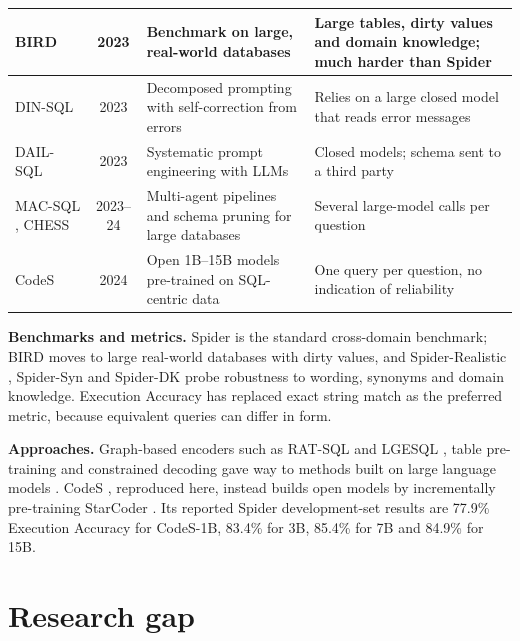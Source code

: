 \begin{table}[!t]
{\begin{tabular}{|p{3.6cm}|c|p{6.0cm}|p{5.2cm}|}
		BIRD \cite{li2023can} & 2023 & Benchmark on large, real-world databases & Large tables, dirty values and domain knowledge; much harder than Spider \\ \hline
		DIN-SQL \cite{pourreza2023dinsql} & 2023 & Decomposed prompting with self-correction from errors & Relies on a large closed model that reads error messages \\ \hline
		DAIL-SQL \cite{gao2023texttosql} & 2023 & Systematic prompt engineering with LLMs & Closed models; schema sent to a third party \\ \hline
		MAC-SQL \cite{wang2023macsql}, CHESS \cite{talaei2024chess} & 2023--24 & Multi-agent pipelines and schema pruning for large databases & Several large-model calls per question \\ \hline
		CodeS \cite{li2024codes} & 2024 & Open 1B--15B models pre-trained on SQL-centric data & One query per question, no indication of reliability \\ \hline
	\end{tabular}}
\end{table}

\textbf{Benchmarks and metrics.} Spider \cite{yu2018spider} is the standard cross-domain benchmark; BIRD \cite{li2023can} moves to large real-world databases with dirty values, and Spider-Realistic \cite{deng2020structuregrounded}, Spider-Syn \cite{gan2021towards} and Spider-DK \cite{gan2021exploring} probe robustness to wording, synonyms and domain knowledge. Execution Accuracy has replaced exact string match as the preferred metric, because equivalent queries can differ in form.

\textbf{Approaches.} Graph-based encoders such as RAT-SQL \cite{wang2019ratsql} and LGESQL \cite{cao2021lgesql}, table pre-training \cite{yin2020tabert, yu2020grappa} and constrained decoding \cite{scholak2021picard} gave way to methods built on large language models \cite{liu2023a, pourreza2023dinsql, gao2023texttosql, wang2023macsql, talaei2024chess, pourreza2024chasesql}. CodeS \cite{li2024codes}, reproduced here, instead builds open models by incrementally pre-training StarCoder \cite{li2023starcoder}. Its reported Spider development-set results are 77.9\% Execution Accuracy for CodeS-1B, 83.4\% for 3B, 85.4\% for 7B and 84.9\% for 15B.

\section{Research gap}

